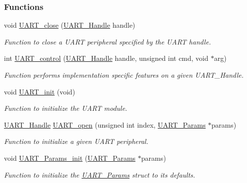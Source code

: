 \subsubsection*{Functions}
\begin{DoxyCompactItemize}
\item 
void \hyperlink{_u_a_r_t_8h_a6b49b65f3db709c408dc4db23a68895d}{U\+A\+R\+T\+\_\+close} (\hyperlink{_u_a_r_t_8h_a13cc669fae768d8212e6491ce71b28af}{U\+A\+R\+T\+\_\+\+Handle} handle)
\begin{DoxyCompactList}\small\item\em Function to close a U\+A\+R\+T peripheral specified by the U\+A\+R\+T handle. \end{DoxyCompactList}\item 
int \hyperlink{_u_a_r_t_8h_a9de3c26cfe4ce6b7f350a6ea6e16801d}{U\+A\+R\+T\+\_\+control} (\hyperlink{_u_a_r_t_8h_a13cc669fae768d8212e6491ce71b28af}{U\+A\+R\+T\+\_\+\+Handle} handle, unsigned int cmd, void $\ast$arg)
\begin{DoxyCompactList}\small\item\em Function performs implementation specific features on a given U\+A\+R\+T\+\_\+\+Handle. \end{DoxyCompactList}\item 
void \hyperlink{_u_a_r_t_8h_ab60a36f7295d704926120d22f806dcd1}{U\+A\+R\+T\+\_\+init} (void)
\begin{DoxyCompactList}\small\item\em Function to initialize the U\+A\+R\+T module. \end{DoxyCompactList}\item 
\hyperlink{_u_a_r_t_8h_a13cc669fae768d8212e6491ce71b28af}{U\+A\+R\+T\+\_\+\+Handle} \hyperlink{_u_a_r_t_8h_a0442ea1ec23901168da31726bb3254c1}{U\+A\+R\+T\+\_\+open} (unsigned int index, \hyperlink{struct_u_a_r_t___params}{U\+A\+R\+T\+\_\+\+Params} $\ast$params)
\begin{DoxyCompactList}\small\item\em Function to initialize a given U\+A\+R\+T peripheral. \end{DoxyCompactList}\item 
void \hyperlink{_u_a_r_t_8h_a40e5c0823bb7ffd2e8fbf19f9f20b399}{U\+A\+R\+T\+\_\+\+Params\+\_\+init} (\hyperlink{struct_u_a_r_t___params}{U\+A\+R\+T\+\_\+\+Params} $\ast$params)
\begin{DoxyCompactList}\small\item\em Function to initialize the \hyperlink{struct_u_a_r_t___params}{U\+A\+R\+T\+\_\+\+Params} struct to its defaults. \end{DoxyCompactList}\item 

\end{DoxyCompactItemize}

